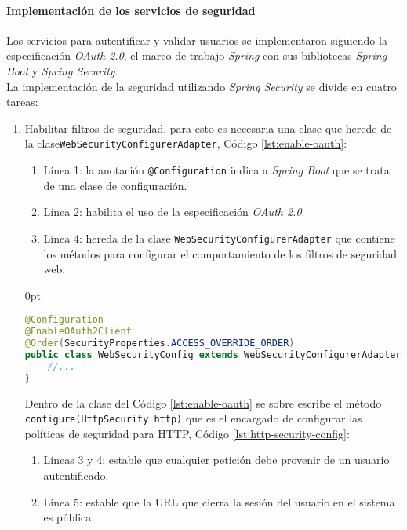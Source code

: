 \paragraph{Implementación de los servicios de seguridad\\}
Los servicios para autentificar y validar usuarios se implementaron siguiendo la especificación \textit{OAuth 2.0}, el marco de trabajo \textit{Spring} con sus bibliotecas \textit{Spring Boot} y \textit{Spring Security}.\\
La implementación de la seguridad utilizando \textit{Spring Security} se divide en cuatro tareas:
\begin{enumerate}
	\item Habilitar filtros de seguridad, para esto es necesaria una clase que herede de la clase\linebreak\texttt{WebSecurityConfigurerAdapter}, Código \ref{lst:enable-oauth}:
	\begin{enumerate}
		\item Línea 1: la anotación \texttt{@Configuration} indica a \textit{Spring Boot} que se trata de una clase de configuración.
		\item Línea 2: habilita el uso de la especificación \textit{OAuth 2.0}.
		\item Línea 4: hereda de la clase \texttt{WebSecurityConfigurerAdapter} que contiene los métodos para configurar el comportamiento de los filtros de seguridad web.
	\end{enumerate}
\begin{adjustwidth}{\listingfixwidth}{0pt}
\begin{lstlisting}[language=Java, caption={Clase para habilitar los filtros de seguridad.}, captionpos=b, label={lst:enable-oauth}]
@Configuration
@EnableOAuth2Client
@Order(SecurityProperties.ACCESS_OVERRIDE_ORDER)
public class WebSecurityConfig extends WebSecurityConfigurerAdapter{
	//...
}
\end{lstlisting}
\end{adjustwidth}
	Dentro de la clase del Código \ref{lst:enable-oauth} se sobre escribe el método \texttt{configure(HttpSecurity http)} que es el encargado de configurar las políticas de seguridad para HTTP, Código \ref{lst:http-security-config}:
	\begin{enumerate}
		\item Líneas 3 y 4: estable que cualquier petición debe provenir de un usuario autentificado.
		\item Línea 5: estable que la URL que cierra la sesión del usuario en el sistema es pública.

\end{enumerate}
\end{enumerate}
